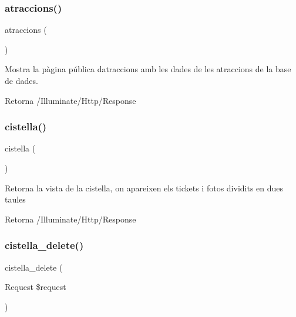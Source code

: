 \subsubsection{\texorpdfstring{atraccions()}{atraccions()}}
{\footnotesize\ttfamily atraccions (\begin{DoxyParamCaption}{ }\end{DoxyParamCaption})}

Mostra la pàgina pública d\textquotesingle{}atraccions amb les dades de les atraccions de la base de dades.

\begin{DoxyReturn}{Retorna}
/\+Illuminate/\+Http/\+Response 
\end{DoxyReturn}
\mbox{\label{class_app_1_1_http_1_1_controllers_1_1_home_controller_af02bbdb3fa93a6391b1fce6f5b23cd6e}} 
\subsubsection{\texorpdfstring{cistella()}{cistella()}}
{\footnotesize\ttfamily cistella (\begin{DoxyParamCaption}{ }\end{DoxyParamCaption})}

Retorna la vista de la cistella, on apareixen els tickets i fotos dividits en dues taules \begin{DoxyReturn}{Retorna}
/\+Illuminate/\+Http/\+Response 
\end{DoxyReturn}
\mbox{\label{class_app_1_1_http_1_1_controllers_1_1_home_controller_a11ee599bb613616f83b0371a7a0a8503}} 
\subsubsection{\texorpdfstring{cistella\+\_\+delete()}{cistella\_delete()}}
{\footnotesize\ttfamily cistella\+\_\+delete (\begin{DoxyParamCaption}\item[{Request}]{\$request }\end{DoxyParamCaption})}

